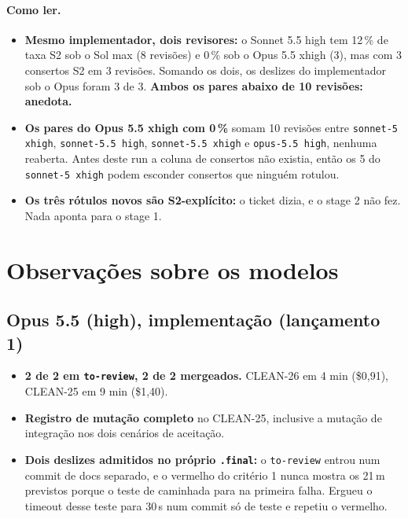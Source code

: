 \documentclass[11pt,a4paper]{article}
\begin{document}
\paragraph{Como ler.}
\begin{itemize}
  \item \textbf{Mesmo implementador, dois revisores:} o Sonnet 5.5 high tem
        12\,\% de taxa S2 sob o Sol max (8 revisões) e 0\,\% sob o Opus 5.5
        xhigh (3), mas com 3 consertos S2 em 3 revisões. Somando os dois, os
        deslizes do implementador sob o Opus foram 3 de 3. \textbf{Ambos os
        pares abaixo de 10 revisões: anedota.}
  \item \textbf{Os pares do Opus 5.5 xhigh com 0\,\%} somam 10 revisões entre
        \texttt{sonnet-5 xhigh}, \texttt{sonnet-5.5 high}, \texttt{sonnet-5.5
        xhigh} e \texttt{opus-5.5 high}, nenhuma reaberta. Antes deste run a
        coluna de consertos não existia, então os 5 do \texttt{sonnet-5
        xhigh} podem esconder consertos que ninguém rotulou.
  \item \textbf{Os três rótulos novos são S2-explícito:} o ticket dizia, e o
        stage 2 não fez. Nada aponta para o stage 1.
\end{itemize}

\section{Observações sobre os modelos}

\subsection*{Opus 5.5 (high), implementação (lançamento 1)}
\begin{itemize}
  \item \textbf{2 de 2 em \texttt{to-review}, 2 de 2 mergeados.} CLEAN-26 em
        4 min (\$0,91), CLEAN-25 em 9 min (\$1,40).
  \item \textbf{Registro de mutação completo} no CLEAN-25, inclusive a mutação
        de integração nos dois cenários de aceitação.
  \item \textbf{Dois deslizes admitidos no próprio \texttt{.final}:} o
        \texttt{to-review} entrou num commit de docs separado, e o vermelho do
        critério 1 nunca mostra os 21\,m previstos porque o teste de caminhada
        para na primeira falha. Ergueu o timeout desse teste para 30\,s num
        commit só de teste e repetiu o vermelho.
\end{itemize}
\end{document}
